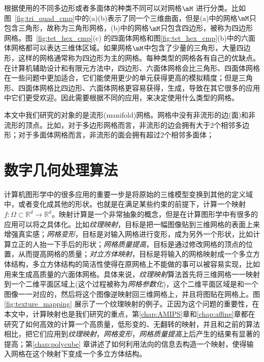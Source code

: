 根据使用的不同多边形或者多面体的种类不同可以对网格$\mM$ 进行分类。比如图~\ref{fig:tri_quad_cmp}中的(a)(b)表示了同一个三维曲面，但是(a)中的网格$\mM$只包含三角形，故称为三角形网格，(b)中的网格$\mM$只包含四边形，被称为四边形网格。图~\ref{fig:tet_hex_cmp}(c) 的四面体网格和图\ref{fig:tet_hex_cmp}(b)中的六面体网格都可以表达三维体区域。如果网格$\mM$中包含了少量的三角形，大量四边形，这样的网格通常称为四边形为主的网格。每种类型的网格各有自己的优缺点。在计算机辅助设计和有限元方法中，四边形、六面体网格会比三角形、四面体网格在一些问题中更加适合，它们能使用更少的单元获得更高的模拟精度；但是三角形、四面体网格比四边形、六面体网格更容易获得，生成，导致在其它很多的应用中它们更受欢迎。因此需要根据不同的应用，来决定使用什么类型的网格。%

本文中我们研究的对象的是流形(manifold)网格。网格中没有非流形的边(面)和非流形的顶点\cite{Botsch2010}。比如，对于多边形网格而言，非流形的边会拥有大于2个相邻多边形；对于多面体网格而言，非流形的面会拥有超过2个相邻多面体；%


\section{数字几何处理算法} \label{sec:DGP}
计算机图形学中的很多应用的重要一步是将原始的三维模型变换到其他的定义域中，或者变化成其他的形状。也就是在满足某些约束的前提下，计算一个映射$f: \Omega \subset \mathbb{R}^d \rightarrow \mathbb{R}^d$。映射计算是一个非常抽象的概念，但是在计算图形学中有很多的应用可以将之具体化。比如\emph{纹理映射}，目标是把一幅图像贴到三维网格的表面上来增强真实感；\emph{网格变形}，目标是对输入网格进行变形，成为另外一个形状，比如计算立正的人抬一下手后的形状；\emph{网格质量提高}，目标是通过修改网格的顶点的位置，从而提高网格的质量；\emph{对立方体映射}，目标是将输入的网格映射成一个多立方体结构，多立方体结构的简洁性使得在原网格上不能做的事可以被容易实现，比如用来生成高质量的六面体网格。具体来说，\emph{纹理映射}算法首先将三维网格一一映射到一个二维平面区域上(这个过程被称为\emph{网格参数化})，这个二维平面区域是和一个图像一一对应的，然后将这个图像逆映射回三维网格上，并且将图贴在网格上。图\ref{fig:texture_mapping} 展示了一个纹理映射的例子。正因为这个问题的重要性，在本文中，计算映射也是我们研究的重点，第\ref{chap:AMIPS}章和\ref{chap:affine}章都在研究了如何高效的计算一个高质量，低形变的、无翻转的映射，并且和之前的算法相比，把它们应用到\emph{纹理映射}，\emph{网格变形}，\emph{网格质量提高}上后产生的结果有显著的提高；第\ref{chap:polycube} 章讲述了如何利用法向的信息去构造一个映射，使得输入网格在这个映射下变成一个多立方体结构。

